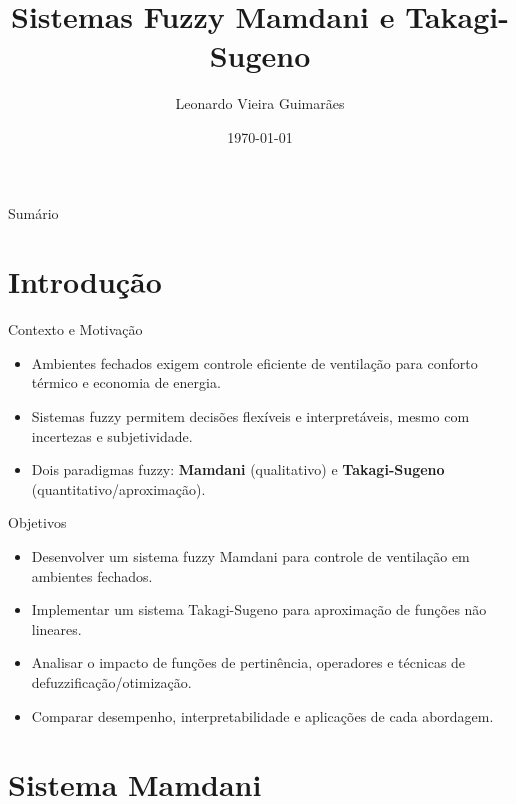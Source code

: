 \documentclass[aspectratio=169]{beamer}
\title[Sistemas Fuzzy Mamdani e Takagi-Sugeno]{Sistemas Fuzzy Mamdani e Takagi-Sugeno}
\author[Leonardo V. Guimarães]{Leonardo Vieira Guimarães}
\institute[CEFET-MG]{Pós-Graduação em Engenharia Elétrica, CEFET-MG}
\date{\today}
\begin{document}
\begin{frame}
    \titlepage
\end{frame}

\begin{frame}{Sumário}
    \tableofcontents
\end{frame}

\section*{Introdução}

\begin{frame}{Contexto e Motivação}
    \begin{itemize}
        \item Ambientes fechados exigem controle eficiente de ventilação para conforto térmico e economia de energia.
        \item Sistemas fuzzy permitem decisões flexíveis e interpretáveis, mesmo com incertezas e subjetividade.
        \item Dois paradigmas fuzzy: \textbf{Mamdani} (qualitativo) e \textbf{Takagi-Sugeno} (quantitativo/aproximação).
    \end{itemize}
\end{frame}

\begin{frame}{Objetivos}
    \begin{itemize}
        \item Desenvolver um sistema fuzzy Mamdani para controle de ventilação em ambientes fechados.
        \item Implementar um sistema Takagi-Sugeno para aproximação de funções não lineares.
        \item Analisar o impacto de funções de pertinência, operadores e técnicas de defuzzificação/otimização.
        \item Comparar desempenho, interpretabilidade e aplicações de cada abordagem.
    \end{itemize}
\end{frame}

\section{Sistema Mamdani}
\end{document}
